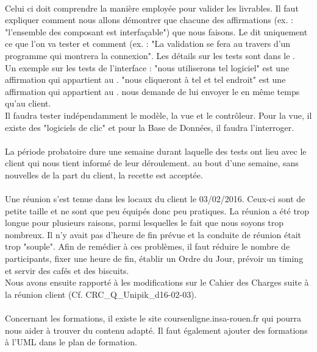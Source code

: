 \documentclass [a4paper] {article}
\begin{document}
\paragraph{}
Celui ci doit comprendre la manière employée pour valider les livrables. Il faut expliquer comment nous allons démontrer que chacune des affirmations (ex. : "l'ensemble des composant est interfaçable") que nous faisons. Le \PTVCourt{} dit uniquement ce que l'on va tester et comment (ex. : "La validation se fera au travers d'un programme qui montrera la connexion". Les détails sur les tests sont dans le \CDR{}.
\\
Un exemple sur les tests de l'interface : "nous utiliserons tel logiciel" est une affirmation qui appartient au \PTVCourt{}. "nous cliqueront à tel et tel endroit" est une affirmation qui appartient au \CDR{}. \nomTuteurPedago{} nous demande de lui envoyer le \PTV{} en même temps qu'au client.
\\
Il faudra tester indépendamment le modèle, la vue et le contrôleur. Pour la vue, il existe des "logiciels de clic" et pour la Base de Données, il faudra l'interroger.
\paragraph{}
La période probatoire dure une semaine durant laquelle des tests ont lieu avec le client qui nous tient informé de leur déroulement. au bout d'une semaine, sans nouvelles de la part du client, la recette est acceptée.
\paragraph{}
Une réunion s'est tenue dans les locaux du client le 03/02/2016. Ceux-ci sont de petite taille et ne sont que peu équipés donc peu pratiques. La réunion a été trop longue pour plusieurs raisons, parmi lesquelles le fait que nous soyons trop nombreux. Il n'y avait pas d'heure de fin prévue et la conduite de réunion était trop "souple". Afin de remédier à ces problèmes, il faut réduire le nombre de participants, fixer une heure de fin, établir un Ordre du Jour, prévoir un timing et servir des cafés et des biscuits.
\\
Nous avons ensuite rapporté à \nomTuteurPedago{} les modifications sur le Cahier des Charges suite à la réunion client (Cf. CRC\_Q\_Unipik\_d16-02-03).
\paragraph{}
Concernant les formations, il existe le site coursenligne.insa-rouen.fr qui pourra nous aider à trouver du contenu adapté. Il faut également ajouter des formations à l'UML dans le plan de formation.
\end{document}
